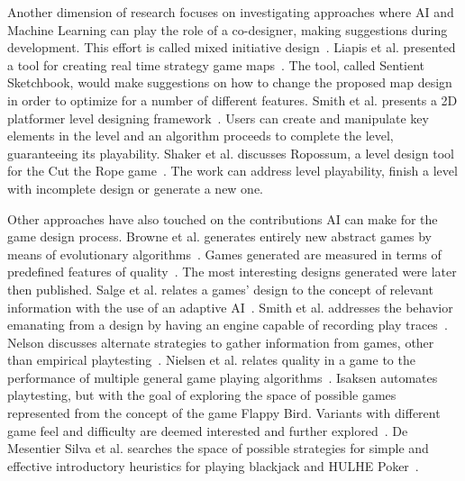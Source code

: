 \documentclass[letterpaper]{article} %
\begin{document}
Another dimension of research focuses on investigating approaches where AI and Machine Learning can play the role of a co-designer, making suggestions during development. This effort is called mixed initiative design~\cite{yannakakis2014mixed}. Liapis et al. presented a tool for creating real time strategy game maps~\cite{liapis2013sentient}. The tool, called Sentient Sketchbook, would make suggestions on how to change the proposed map design in order to optimize for a number of different features. Smith et al. presents a 2D platformer level designing framework~\cite{smith2010tanagra}. Users can create and manipulate key elements in the level and an algorithm proceeds to complete the level, guaranteeing its playability. Shaker et al. discusses Ropossum, a level design tool for the Cut the Rope game~\cite{shaker2013ropossum}. The work can address level playability, finish a level with incomplete design or generate a new one.

Other approaches have also touched on the contributions AI can make for the game design process. Browne et al. generates entirely new abstract games by means of evolutionary algorithms~\cite{browne2010evolutionary}. Games generated are measured in terms of predefined features of quality~\cite{browne2008automatic}. The most interesting designs generated were later then published. Salge et al. relates a games' design to the concept of relevant information with the use of an adaptive AI~\cite{[7]salge2010relevant}. Smith et al. addresses the behavior emanating from a design by having an engine capable of recording play traces~\cite{smith2010ludocore}. Nelson discusses alternate strategies to gather information from games, other than empirical playtesting~\cite{Metrics:IDP11}. Nielsen et al. relates quality in a game to the performance of multiple general game playing algorithms~\cite{nielsen2015general}. Isaksen automates playtesting, but with the goal of exploring the space of possible games represented from the concept of the game Flappy Bird. Variants with different game feel and difficulty are deemed interested and further explored~\cite{isaksen2015discovering,isaksen2015exploring}. De Mesentier Silva et al. searches the space of possible strategies for simple and effective introductory heuristics for playing blackjack and HULHE Poker~\cite{degenerating,de2018preflop,de2018post-flop}.

\end{document}
